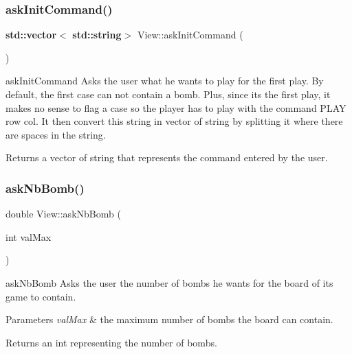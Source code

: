 \subsubsection{\texorpdfstring{ask\+Init\+Command()}{askInitCommand()}}
{\footnotesize\ttfamily \textbf{ std\+::vector}$<$\textbf{ std\+::string}$>$ View\+::ask\+Init\+Command (\begin{DoxyParamCaption}{ }\end{DoxyParamCaption})}



ask\+Init\+Command Asks the user what he wants to play for the first play. By default, the first case can not contain a bomb. Plus, since it\textquotesingle{}s the first play, it makes no sense to flag a case so the player has to play with the command \textquotesingle{}P\+L\+AY row col\textquotesingle{}. It then convert this string in vector of string by splitting it where there are spaces in the string. 

\begin{DoxyReturn}{Returns}
a vector of string that represents the command entered by the user. 
\end{DoxyReturn}
\mbox{\label{class_view_ada30dc373b340ac38470139af634f51c}} 
\subsubsection{\texorpdfstring{ask\+Nb\+Bomb()}{askNbBomb()}}
{\footnotesize\ttfamily double View\+::ask\+Nb\+Bomb (\begin{DoxyParamCaption}\item[{int}]{val\+Max }\end{DoxyParamCaption})}



ask\+Nb\+Bomb Asks the user the number of bombs he wants for the board of its game to contain. 


\begin{DoxyParams}{Parameters}
{\em val\+Max} & the maximum number of bombs the board can contain. \\
\hline
\end{DoxyParams}
\begin{DoxyReturn}{Returns}
an int representing the number of bombs. 
\end{DoxyReturn}
\mbox{\label{class_view_a09d71faa86480f94e129fdf98cc7b0e0}} 
